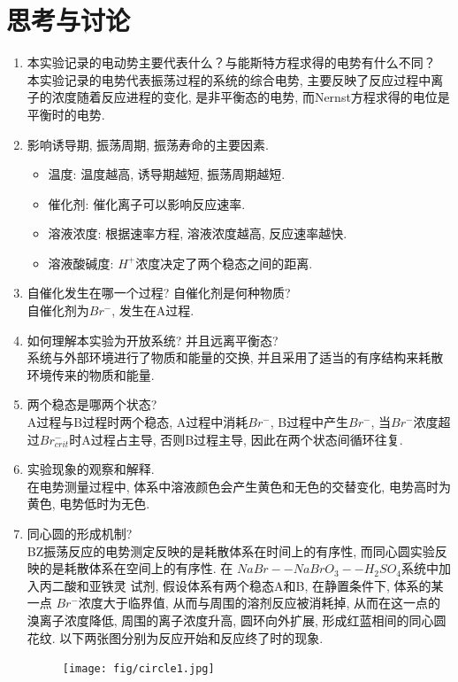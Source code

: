 \documentclass[a4paper]{article}
\begin{document}
\section{思考与讨论}
\begin{enumerate}
	\item 本实验记录的电动势主要代表什么？与能斯特方程求得的电势有什么不同？\\
	本实验记录的电势代表振荡过程的系统的综合电势,
	主要反映了反应过程中离子的浓度随着反应进程的变化, 
	是非平衡态的电势, 而Nernst方程求得的电位是平衡时的电势.
	\item 影响诱导期, 振荡周期, 振荡寿命的主要因素.
	\begin{itemize}
		\item 温度: 温度越高, 诱导期越短, 振荡周期越短.
		\item 催化剂: 催化离子可以影响反应速率.
		\item 溶液浓度: 根据速率方程, 溶液浓度越高, 反应速率越快.
		\item 溶液酸碱度: $H^{+}$浓度决定了两个稳态之间的距离. 
	\end{itemize}
	\item 自催化发生在哪一个过程? 自催化剂是何种物质?\\
	自催化剂为$Br^{-}$, 发生在A过程.
	\item 如何理解本实验为开放系统? 并且远离平衡态?\\
	系统与外部环境进行了物质和能量的交换, 
	并且采用了适当的有序结构来耗散环境传来的物质和能量.
	\item 两个稳态是哪两个状态?\\
	A过程与B过程时两个稳态, A过程中消耗$Br^{-}$, B过程中产生$Br^{-}$, 
	当$Br^{-}$浓度超过$Br^{-}_{crit}$时A过程占主导,
	否则B过程主导, 因此在两个状态间循环往复.
	\item 实验现象的观察和解释.\\
	在电势测量过程中, 体系中溶液颜色会产生黄色和无色的交替变化,
	电势高时为黄色, 电势低时为无色. 
	\item 同心圆的形成机制?\\
	BZ振荡反应的电势测定反映的是耗散体系在时间上的有序性,
	而同心圆实验反映的是耗散体系在空间上的有序性. 在
	$NaBr -- NaBrO_{3} -- H_{2}SO_{4}$系统中加入丙二酸和亚铁灵
	试剂, 假设体系有两个稳态A和B, 在静置条件下, 体系的某一点
	$Br^{-}$浓度大于临界值, 从而与周围的溶剂反应被消耗掉, 
	从而在这一点的溴离子浓度降低, 周围的离子浓度升高, 圆环向外扩展,
	形成红蓝相间的同心圆花纹. 以下两张图分别为反应开始和反应终了时的现象.
	\begin{figure}[!h]
		\centering
		\texttt{[image: fig/circle1.jpg]}\\

\end{figure}
\end{enumerate}
\end{document}
